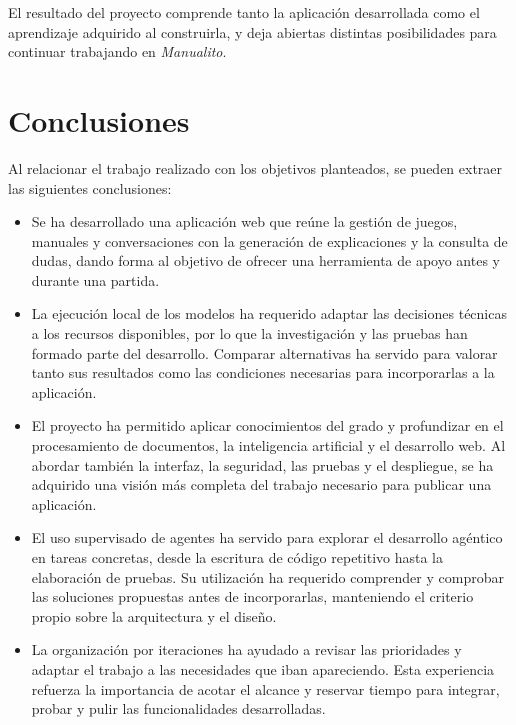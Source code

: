
El resultado del proyecto comprende tanto la aplicación desarrollada como
el aprendizaje adquirido al construirla, y deja abiertas distintas
posibilidades para continuar trabajando en \textit{Manualito}.

\section{Conclusiones}
\label{conclusiones:balance}

Al relacionar el trabajo realizado con los objetivos planteados, se pueden
extraer las siguientes conclusiones:

\begin{itemize}
    \item Se ha desarrollado una aplicación web que reúne la gestión de
    juegos, manuales y conversaciones con la generación de explicaciones
    y la consulta de dudas, dando forma al objetivo de ofrecer una
    herramienta de apoyo antes y durante una partida.

    \item La ejecución local de los modelos ha requerido adaptar las
    decisiones técnicas a los recursos disponibles, por lo que la
    investigación y las pruebas han formado parte del desarrollo.
    Comparar alternativas ha servido para valorar tanto sus resultados
    como las condiciones necesarias para incorporarlas a la aplicación.

    \item El proyecto ha permitido aplicar conocimientos del grado y
    profundizar en el procesamiento de documentos, la inteligencia
    artificial y el desarrollo web. Al abordar también la interfaz,
    la seguridad, las pruebas y el despliegue, se ha adquirido una visión
    más completa del trabajo necesario para publicar una aplicación.

    \item El uso supervisado de agentes ha servido para explorar el
    desarrollo agéntico en tareas concretas, desde la escritura de código
    repetitivo hasta la elaboración de pruebas. Su utilización ha requerido
    comprender y comprobar las soluciones propuestas antes de incorporarlas,
    manteniendo el criterio propio sobre la arquitectura y el diseño.

    \item La organización por iteraciones ha ayudado a revisar las
    prioridades y adaptar el trabajo a las necesidades que iban apareciendo.
    Esta experiencia refuerza la importancia de acotar el alcance y reservar
    tiempo para integrar, probar y pulir las funcionalidades desarrolladas.
\end{itemize}

